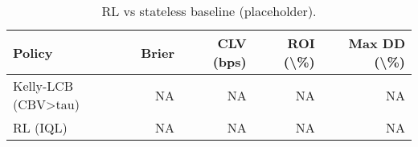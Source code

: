 \begin{table}

\caption{\label{tab:unnamed-chunk-1}RL vs stateless baseline (placeholder).}
\centering
\begin{tabular}[t]{lrrrr}
\toprule
Policy & Brier & CLV (bps) & ROI (\textbackslash{}\%) & Max DD (\textbackslash{}\%)\\
\midrule
Kelly-LCB (CBV>tau) & NA & NA & NA & NA\\
RL (IQL) & NA & NA & NA & NA\\
\bottomrule
\end{tabular}
\end{table}
